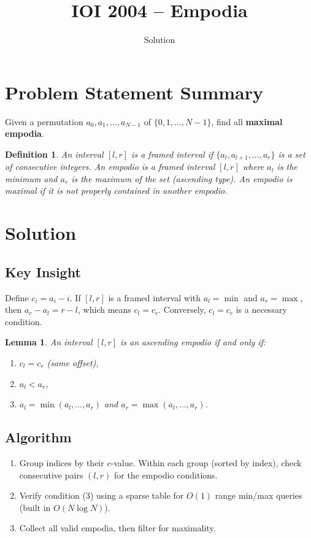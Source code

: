 \documentclass[11pt,a4paper]{article}
\title{IOI 2004 -- Empodia}
\author{Solution}
\date{}
\newtheorem{lemma}[theorem]{Lemma}
\newtheorem{definition}{Definition}
\begin{document}
\maketitle

\section{Problem Statement Summary}
Given a permutation $a_0, a_1, \ldots, a_{N-1}$ of $\{0, 1, \ldots, N-1\}$,
find all \textbf{maximal empodia}.

\begin{definition}
An interval $[l, r]$ is a \emph{framed interval} if
$\{a_l, a_{l+1}, \ldots, a_r\}$ is a set of consecutive integers.
An \emph{empodio} is a framed interval $[l, r]$ where $a_l$ is the
minimum and $a_r$ is the maximum of the set (ascending type).
An empodio is \emph{maximal} if it is not properly contained in another
empodio.
\end{definition}

\section{Solution}

\subsection{Key Insight}
Define $c_i = a_i - i$. If $[l, r]$ is a framed interval with
$a_l = \min$ and $a_r = \max$, then $a_r - a_l = r - l$, which means
$c_l = c_r$. Conversely, $c_l = c_r$ is a necessary condition.

\begin{lemma}
An interval $[l, r]$ is an ascending empodio if and only if:
\begin{enumerate}
  \item $c_l = c_r$ (same offset),
  \item $a_l < a_r$,
  \item $a_l = \min(a_l, \ldots, a_r)$ and $a_r = \max(a_l, \ldots, a_r)$.
\end{enumerate}
\end{lemma}

\subsection{Algorithm}
\begin{enumerate}
  \item Group indices by their $c$-value. Within each group (sorted by
        index), check consecutive pairs $(l, r)$ for the empodio
        conditions.
  \item Verify condition (3) using a sparse table for $O(1)$ range
        min/max queries (built in $O(N \log N)$).
  \item Collect all valid empodia, then filter for maximality.
\end{enumerate}
\end{document}
